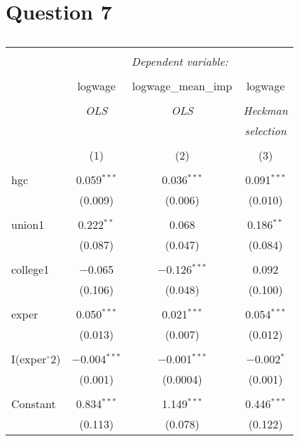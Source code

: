 \documentclass{article}
\begin{document}
\section*{Question 7}
\begin{table}[!htbp] \centering 
  \caption{} 
  \label{} 
\begin{tabular}{@{\extracolsep{5pt}}lccc} 
\\[-1.8ex]\hline 
\hline \\[-1.8ex] 
 & \multicolumn{3}{c}{\textit{Dependent variable:}} \\ 
\cline{2-4} 
\\[-1.8ex] & logwage & logwage\_mean\_imp & logwage \\ 
\\[-1.8ex] & \textit{OLS} & \textit{OLS} & \textit{Heckman} \\ 
 & \textit{} & \textit{} & \textit{selection} \\ 
\\[-1.8ex] & (1) & (2) & (3)\\ 
\hline \\[-1.8ex] 
 hgc & 0.059$^{***}$ & 0.036$^{***}$ & 0.091$^{***}$ \\ 
  & (0.009) & (0.006) & (0.010) \\ 
  & & & \\ 
 union1 & 0.222$^{**}$ & 0.068 & 0.186$^{**}$ \\ 
  & (0.087) & (0.047) & (0.084) \\ 
  & & & \\ 
 college1 & $-$0.065 & $-$0.126$^{***}$ & 0.092 \\ 
  & (0.106) & (0.048) & (0.100) \\ 
  & & & \\ 
 exper & 0.050$^{***}$ & 0.021$^{***}$ & 0.054$^{***}$ \\ 
  & (0.013) & (0.007) & (0.012) \\ 
  & & & \\ 
 I(exper$\hat{\mkern6mu}$2) & $-$0.004$^{***}$ & $-$0.001$^{***}$ & $-$0.002$^{*}$ \\ 
  & (0.001) & (0.0004) & (0.001) \\ 
  & & & \\ 
 Constant & 0.834$^{***}$ & 1.149$^{***}$ & 0.446$^{***}$ \\ 
  & (0.113) & (0.078) & (0.122) \\ 

\end{tabular}
\end{table}
\end{document}
